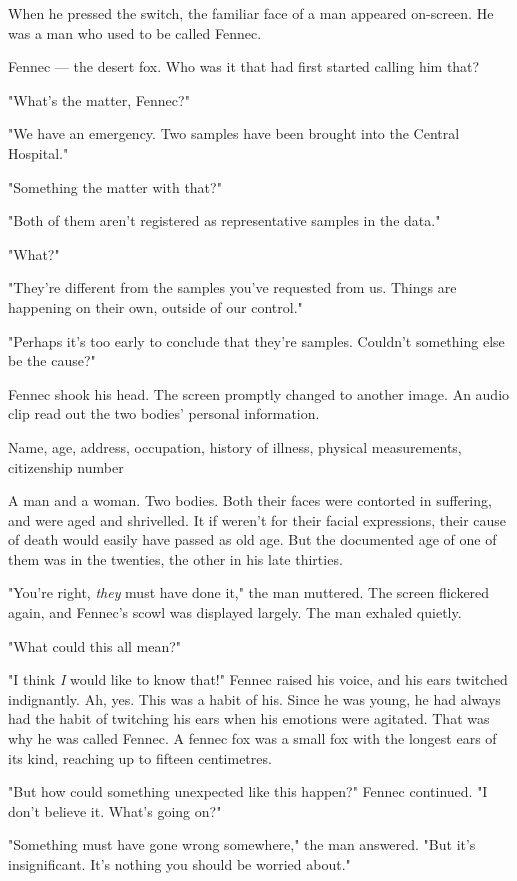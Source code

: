 When he pressed the switch, the familiar face of a man appeared
on-screen. He was a man who used to be called Fennec.

Fennec --- the desert fox. Who was it that had first started calling him
that?

"What's the matter, Fennec?"

"We have an emergency. Two samples have been brought into the Central
Hospital."

"Something the matter with that?"

"Both of them aren't registered as representative samples in the data."

"What?"

"They're different from the samples you've requested from us. Things are
happening on their own, outside of our control."

"Perhaps it's too early to conclude that they're samples. Couldn't
something else be the cause?"

Fennec shook his head. The screen promptly changed to another image. An
audio clip read out the two bodies' personal information.

Name, age, address, occupation, history of illness, physical
measurements, citizenship number\el 

A man and a woman. Two bodies. Both their faces were contorted in
suffering, and were aged and shrivelled. It if weren't for their facial
expressions, their cause of death would easily have passed as old age.
But the documented age of one of them was in the twenties, the other in
his late thirties.

"You're right, \emph{they} must have done it," the man muttered. The screen
flickered again, and Fennec's scowl was displayed largely. The man
exhaled quietly.

"\el What could this all mean?"

"I think \emph{I} would like to know that!" Fennec raised his voice, and his
ears twitched indignantly. Ah, yes. This was a habit of his. Since he
was young, he had always had the habit of twitching his ears when his
emotions were agitated. That was why he was called Fennec. A fennec fox
was a small fox with the longest ears of its kind, reaching up to
fifteen centimetres.

"But how could something unexpected like this happen?" Fennec continued.
"I don't believe it. What's going on?"

"Something must have gone wrong somewhere," the man answered. "But it's
insignificant. It's nothing you should be worried about."

